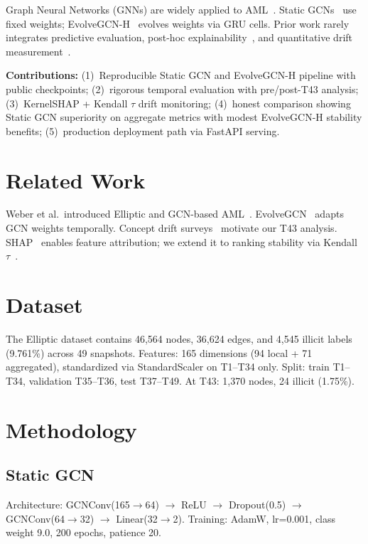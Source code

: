 \documentclass[conference]{IEEEtran}
\begin{document}
Graph Neural Networks (GNNs) are widely applied to AML~\cite{weber2019anti,weber2020aml}. Static GCNs~\cite{kipf2017semi} use fixed weights; EvolveGCN-H~\cite{pareja2020evolvegcn} evolves weights via GRU cells. Prior work rarely integrates predictive evaluation, post-hoc explainability~\cite{lundberg2017unified}, and quantitative drift measurement~\cite{lu2019learning}.

\textbf{Contributions:} (1)~Reproducible Static GCN and EvolveGCN-H pipeline with public checkpoints; (2)~rigorous temporal evaluation with pre/post-T43 analysis; (3)~KernelSHAP + Kendall $\tau$ drift monitoring; (4)~honest comparison showing Static GCN superiority on aggregate metrics with modest EvolveGCN-H stability benefits; (5)~production deployment path via FastAPI serving.

\section{Related Work}
Weber et al.\ introduced Elliptic and GCN-based AML~\cite{weber2019anti}. EvolveGCN~\cite{pareja2020evolvegcn} adapts GCN weights temporally. Concept drift surveys~\cite{gama2014survey,lu2019learning} motivate our T43 analysis. SHAP~\cite{lundberg2017unified} enables feature attribution; we extend it to ranking stability via Kendall $\tau$~\cite{kendall1938new}.

\section{Dataset}
The Elliptic dataset contains 46,564 nodes, 36,624 edges, and 4,545 illicit labels (9.761\%) across 49 snapshots. Features: 165 dimensions (94 local + 71 aggregated), standardized via StandardScaler on T1--T34 only. Split: train T1--T34, validation T35--T36, test T37--T49. At T43: 1,370 nodes, 24 illicit (1.75\%).

\section{Methodology}

\subsection{Static GCN}
Architecture: GCNConv(165$\rightarrow$64) $\rightarrow$ ReLU $\rightarrow$ Dropout(0.5) $\rightarrow$ GCNConv(64$\rightarrow$32) $\rightarrow$ Linear(32$\rightarrow$2). Training: AdamW, lr=0.001, class weight 9.0, 200 epochs, patience 20.
\end{document}
